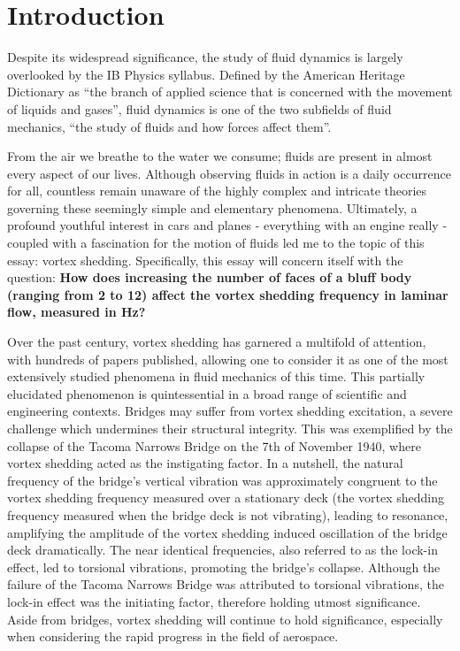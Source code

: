 \section*{Introduction}
Despite its widespread significance, the study of fluid dynamics is largely overlooked by the IB Physics syllabus. Defined by the American Heritage Dictionary as “the branch of applied science that is concerned with the movement of liquids and gases”, fluid dynamics is one of the two subfields of fluid mechanics, “the study of fluids and how forces affect them”.

From the air we breathe to the water we consume; fluids are present in almost every aspect of our lives. Although observing fluids in action is a daily occurrence for all, countless remain unaware of the highly complex and intricate theories governing these seemingly simple and elementary phenomena. Ultimately, a profound youthful interest in cars and planes - everything with an engine really - coupled with a fascination for the motion of fluids led me to the topic of this essay: vortex shedding. Specifically, this essay will concern itself with the question: \textbf{How does increasing the number of faces of a bluff body (ranging from 2 to 12) affect the vortex shedding frequency in laminar flow, measured in Hz?}

Over the past century, vortex shedding has garnered a multifold of attention, with hundreds of papers published, allowing one to consider it as one of the most extensively studied phenomena in fluid mechanics of this time. This partially elucidated phenomenon is quintessential in a broad range of scientific and engineering contexts. Bridges may suffer from vortex shedding excitation, a severe challenge which undermines their structural integrity. This was exemplified by the collapse of the Tacoma Narrows Bridge on the 7th of November 1940, where vortex shedding acted as the instigating factor. In a nutshell, the natural frequency of the bridge’s vertical vibration was approximately congruent to the vortex shedding frequency measured over a stationary deck (the vortex shedding frequency measured when the bridge deck is not vibrating), leading to resonance, amplifying the amplitude of the vortex shedding induced oscillation of the bridge deck dramatically. The near identical frequencies, also referred to as the lock-in effect, led to torsional vibrations, promoting the bridge’s collapse. Although the failure of the Tacoma Narrows Bridge was attributed to torsional vibrations, the lock-in effect was the initiating factor, therefore holding utmost significance. Aside from bridges, vortex shedding will continue to hold significance, especially when considering the rapid progress in the field of aerospace.

